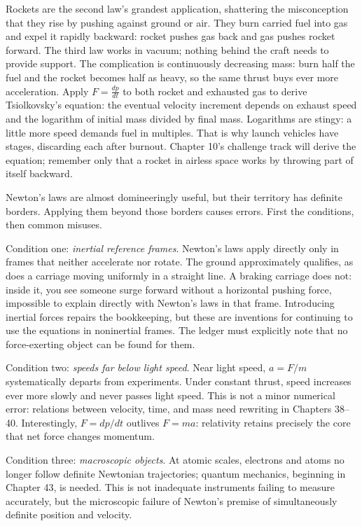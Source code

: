 \begin{challenge}
Rockets are the second law's grandest application, shattering the misconception that they rise by pushing against ground or air. They burn carried fuel into gas and expel it rapidly backward: rocket pushes gas back and gas pushes rocket forward. The third law works in vacuum; nothing behind the craft needs to provide support. The complication is continuously decreasing mass: burn half the fuel and the rocket becomes half as heavy, so the same thrust buys ever more acceleration. Apply \(F=\frac{dp}{dt}\) to both rocket and exhausted gas to derive Tsiolkovsky's equation: the eventual velocity increment depends on exhaust speed and the logarithm of initial mass divided by final mass. Logarithms are stingy: a little more speed demands fuel in multiples. That is why launch vehicles have stages, discarding each after burnout. Chapter 10's challenge track will derive the equation; remember only that a rocket in airless space works by throwing part of itself backward.
\end{challenge}


\begin{mainline}
Newton's laws are almost domineeringly useful, but their territory has definite borders. Applying them beyond those borders causes errors. First the conditions, then common misuses.

Condition one: \emph{inertial reference frames}. Newton's laws apply directly only in frames that neither accelerate nor rotate. The ground approximately qualifies, as does a carriage moving uniformly in a straight line. A braking carriage does not: inside it, you see someone surge forward without a horizontal pushing force, impossible to explain directly with Newton's laws in that frame. Introducing inertial forces repairs the bookkeeping, but these are inventions for continuing to use the equations in noninertial frames. The ledger must explicitly note that no force-exerting object can be found for them.

Condition two: \emph{speeds far below light speed}. Near light speed, \(a=F/m\) systematically departs from experiments. Under constant thrust, speed increases ever more slowly and never passes light speed. This is not a minor numerical error: relations between velocity, time, and mass need rewriting in Chapters 38--40. Interestingly, \(F=dp/dt\) outlives \(F=ma\): relativity retains precisely the core that net force changes momentum.

Condition three: \emph{macroscopic objects}. At atomic scales, electrons and atoms no longer follow definite Newtonian trajectories; quantum mechanics, beginning in Chapter 43, is needed. This is not inadequate instruments failing to measure accurately, but the microscopic failure of Newton's premise of simultaneously definite position and velocity.
\end{mainline}


